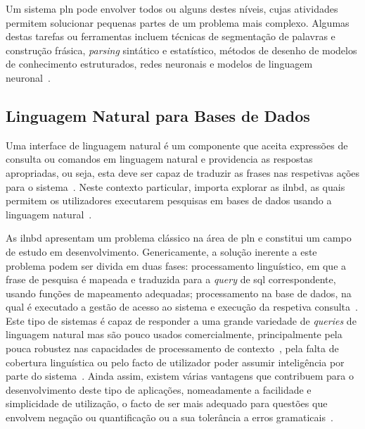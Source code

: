Um sistema \gls{pln} pode envolver todos ou alguns destes níveis, cujas atividades permitem solucionar pequenas partes de um problema mais complexo. Algumas destas tarefas ou ferramentas incluem técnicas de segmentação de palavras e construção frásica, \textit{parsing} sintático e estatístico, métodos de desenho de modelos de conhecimento estruturados, redes neuronais e modelos de linguagem neuronal~\parencite{nlp, speech_language_processing}.

\subsection{Linguagem Natural para Bases de Dados}
Uma interface de linguagem natural é um componente que aceita expressões de consulta ou comandos em linguagem natural e providencia as respostas apropriadas, ou seja, esta deve ser capaz de traduzir as frases nas respetivas ações para o sistema~\parencite{nlp}. Neste contexto particular, importa explorar as \gls{ilnbd}, as quais permitem os utilizadores executarem pesquisas em bases de dados usando a linguagem natural~\parencite{overview_nlidb_approaches_implementation_airline, novel_approach_building_generic_portable_contextual_nlidb_system}.

As \gls{ilnbd} apresentam um problema clássico na área de \gls{pln} e constitui um campo de estudo em desenvolvimento. Genericamente, a solução inerente a este problema podem ser divida em duas fases: processamento linguístico, em que a frase de pesquisa é mapeada e traduzida para a \textit{query} de \gls{sql} correspondente, usando funções de mapeamento adequadas; processamento na base de dados, na qual é executado a gestão de acesso ao sistema e execução da respetiva consulta~\parencite{overview_nlidb_approaches_implementation_airline}. Este tipo de sistemas é capaz de responder a uma grande variedade de \textit{queries} de linguagem natural mas são pouco usados comercialmente, principalmente pela pouca robustez nas capacidades de processamento de contexto~\parencite{novel_approach_towards_incorporating_context_processing_nlidb}, pela falta de cobertura linguística ou pelo facto de utilizador poder assumir inteligência por parte do sistema~\parencite{survey_nlidb, overview_nlidb_approaches_implementation_airline}. Ainda assim, existem várias vantagens que contribuem para o desenvolvimento deste tipo de aplicações, nomeadamente a facilidade e simplicidade de utilização, o facto de ser mais adequado para questões que envolvem negação ou quantificação ou a sua tolerância a erros gramaticais~\parencite{survey_nlidb, nlidb_brief_review, overview_nlidb_approaches_implementation_airline}.

